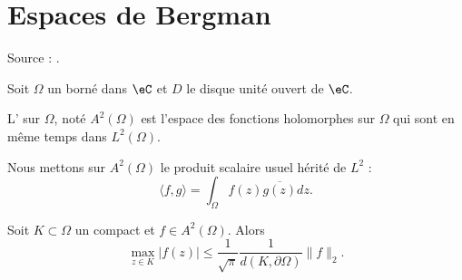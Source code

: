 \section{Espaces de Bergman}

Source : \cite{ytMOpe}.

Soit \( \Omega\) un borné dans \( \eC\) et \( D\) le disque unité ouvert de \( \eC\).

\begin{definition}
    L' sur \( \Omega\), noté \( A^2(\Omega)\) est l'espace des fonctions holomorphes sur \( \Omega\) qui sont en même temps dans \( L^2(\Omega)\).
\end{definition}
Nous mettons sur \( A^2(\Omega)\) le produit scalaire usuel hérité de \( L^2\) :
\begin{equation}
    \langle f, g\rangle =\int_{\Omega}f(z)\overline{ g(z) }dz.
\end{equation}

\begin{lemma}   \label{LemIZxKfB}
    Soit \( K\subset \Omega\) un compact et \( f\in A^2(\Omega)\). Alors
    \begin{equation}
        \max_{z\in K}| f(z) |\leq \frac{1}{ \sqrt{\pi} }\frac{1}{ d(K,\partial \Omega) }\| f \|_2.
    \end{equation}
\end{lemma}

